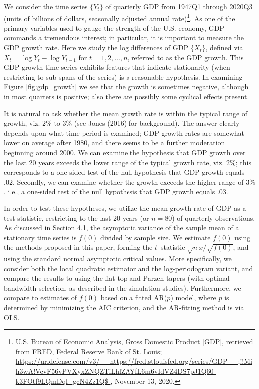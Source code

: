 \documentclass[12p E.Lt,psfig]{article} %
\begin{document}
We consider the time series  $\{ Y_t \}$  of quarterly GDP
 from 1947Q1 through 2020Q3 (units of billions
 of dollars, seasonally adjusted annual rate)\footnote{U.S. Bureau of Economic Analysis, Gross Domestic Product [GDP],
  retrieved from FRED, Federal Reserve Bank of St. Louis;
  \url{https://urldefense.com/v3/__https://fred.stlouisfed.org/series/GDP__;!!Mih3wA!VcvF56vPVXyxZNQZTiLhlZAYfL6m6vIdVZ4DS7pJ1Q60-k3FOtf9LQmDql_gcN4Zz1Q$ }, November 13, 2020.}.
  As one of the primary variables used to gauge the strength of the U.S. economy, GDP commands a tremendous interest;
   in particular, it is important to measure the  GDP growth rate.   Here we study the log differences of GDP $\{ X_t \}$,
    defined via $X_t = \log Y_t - \log Y_{t-1}$ for $ t = 1, 2, \ldots, n$, referred to as the GDP growth.   This GDP growth time series
    exhibits features that indicate stationarity (when restricting to sub-spans of the series)  is a reasonable hypothesis.
    In examining Figure \ref{fig:gdp_growth}  we see that the growth is sometimes negative, although in most quarters is positive;
    also there are possibly some cyclical effects present.

     It is natural to ask whether the mean growth rate is  within the typical range of growth, viz. $2 \%$ to $3 \%$
     (see Jones (2016) for background).  The answer
     clearly depends upon what time period is examined;  GDP growth rates
      are somewhat lower on  average  after 1980, and there seems to be a further moderation beginning around 2000.
      We can examine the hypothesis that GDP growth over the last 20 years exceeds the lower range of the typical
      growth rate, viz. $2 \%$; this corresponds to a one-sided
test of the null hypothesis   that GDP growth equals $.02$. Secondly, we can examine whether the growth exceeds the higher range of $3 \%$, i.e., a one-sided
test of the null hypothesis that GDP growth equals $.03$.

    In order to   test these hypotheses, we utilize the  mean growth rate of GDP  as a test statistic, restricting
     to the last 20 years  (or $n=80$) of
      quarterly observations.    As discussed in Section 4.1, the asymptotic
      variance of the sample mean of a stationary
      time series is $f(0)$ divided by sample size.
 We estimate $f(0)$ using the methods proposed in this paper,
       forming the $t$--statistic       $\sqrt{n} \overline{x}/ \sqrt{ f(0) }$, and using the standard normal asymptotic critical values.
       More specifically,  we consider both the local quadratic estimator and the
log-periodogram variant, and compare
       the results to using the flat-top and Parzen tapers (with optimal bandwidth selection, as described in the
        simulation studies).   Furthermore, we compare to estimates of $f(0)$ based on a fitted AR($p$) model,          where $p$ is determined by minimizing the AIC criterion, and the AR-fitting method is  via OLS.
\end{document}
